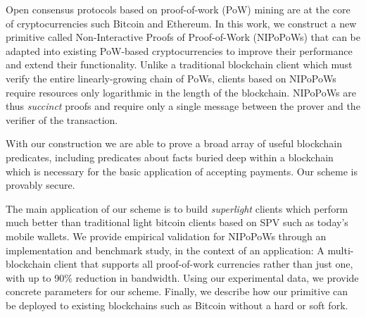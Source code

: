 Open consensus protocols based on proof-of-work (PoW) mining are at the core of cryptocurrencies such Bitcoin and Ethereum. In this work, we construct a new primitive called Non-Interactive Proofs of Proof-of-Work (NIPoPoWs) that can be adapted into existing PoW-based cryptocurrencies to improve their performance and extend their functionality. Unlike a traditional blockchain client which must verify the entire linearly-growing chain of PoWs, clients based on NIPoPoWs require resources only logarithmic in the length of the blockchain. NIPoPoWs are thus \emph{succinct} proofs and require only a single message between the prover and the verifier of the transaction.

With our construction we are able to prove a broad array of useful blockchain predicates, including predicates about facts buried deep within a blockchain which is necessary for the basic application of accepting payments. Our scheme is provably secure.

The main application of our scheme is to build \emph{superlight} clients which perform much better than traditional light bitcoin clients based on SPV such as today's mobile wallets. We provide empirical validation for NIPoPoWs through an implementation and benchmark study, in the context of an application: A multi-blockchain client that supports all proof-of-work currencies rather than just one, with up to 90\% reduction in bandwidth. Using our experimental data, we provide concrete parameters for our scheme. Finally, we describe how our primitive can be deployed to existing blockchains such as Bitcoin without a hard or soft fork.
